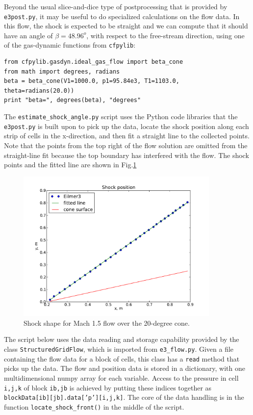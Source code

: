 \medskip
Beyond the usual slice-and-dice type of postprocessing that is provided by \verb!e3post.py!, 
it may be useful to do specialized calculations on the flow data.
In this flow, the shock is expected to be straight and we can compute
that it should have an angle of $\beta = 48.96^o$, with respect to the free-stream direction,
using one of the gas-dynamic functions from \verb!cfpylib!: 
\begin{verbatim}
from cfpylib.gasdyn.ideal_gas_flow import beta_cone
from math import degrees, radians
beta = beta_cone(V1=1000.0, p1=95.84e3, T1=1103.0, theta=radians(20.0))
print "beta=", degrees(beta), "degrees"
\end{verbatim}

The \texttt{estimate\_shock\_angle.py} script uses the Python code libraries 
that the \texttt{e3post.py} is built upon to pick up the data, 
locate the shock position along each strip of cells in the x-direction,
and then fit a straight line to the collected points.
Note that the points from the top right of the flow solution are omitted from the straight-line fit
because the top boundary has interfered with the flow.
The shock points and the fitted line are shown in Fig.\ref{cone20-shock-points-fig} 

\begin{figure}[htbp]
\begin{center}
\includegraphics[width=10cm]{../2D/cone20-simple/shock-shape.pdf}
\end{center}
\caption{Shock shape for Mach 1.5 flow over the 20-degree cone.}
\label{cone20-shock-points-fig}
\end{figure}

The script below uses the data reading and storage capability provided by 
the class \texttt{StructuredGridFlow}, which is imported from \texttt{e3\_flow.py}.
Given a file containing the flow data for a block of cells, this class has a \texttt{read} 
method that picks up the data.
The flow and position data is stored in a dictionary, with one multidimensional numpy array 
for each variable.
Access to the pressure in cell \texttt{i,j,k} of block \texttt{ib,jb} is achieved by
putting these indices together as \texttt{blockData[ib][jb].data['p'][i,j,k]}.
The core of the data handling is in the function \texttt{locate\_shock\_front()}
in the middle of the script.


